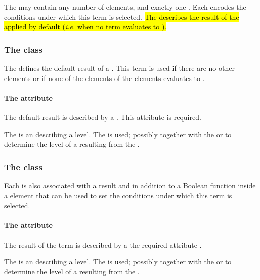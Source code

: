 The \ListOfFunctionTerms may contain any number of \FunctionTerm elements, and exactly one \DefaultTerm.  Each \FunctionTerm encodes the conditions under which this term is selected.  \hl{The \DefaultTerm describes the result of the \Transition applied by default ({\em i.e.} when no term evaluates to ). }

\subsubsection{The \DefaultTerm class}
\label{defaultTerm-class}
The \DefaultTerm defines the default result of a \Transition.  This term is used if there are no other \FunctionTerm elements or if none of the  elements of the \FunctionTerm elements evaluates to . 

\paragraph{The  attribute}
The default result is described by a . This attribute is required.

The  is an  describing a level.  The  is used; possibly together with the  or  to determine the level of a \QualitativeSpecies resulting from the \Transition. 

\subsubsection{The  class}
\label{sec:function-term}

Each \FunctionTerm is also associated with a result  and in addition to a Boolean function inside a  element that can be used to set the conditions under which this term is selected.

\paragraph{The  attribute}
The result of the term is described by a the required attribute .

The  is an  describing a level.   The  is used; possibly together with the  or  to determine the level of a \QualitativeSpecies resulting from the \Transition. 

